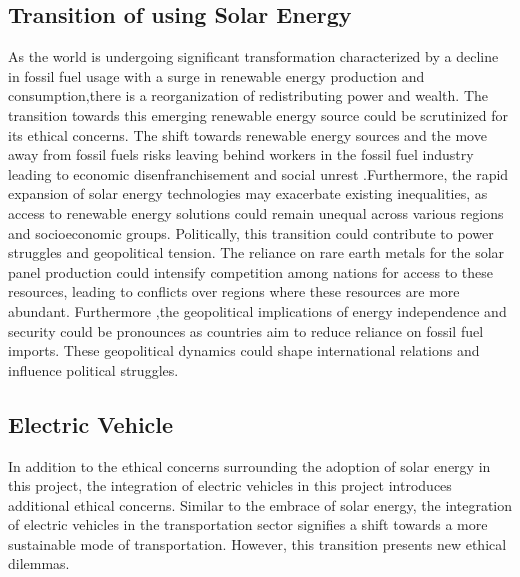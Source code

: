\documentclass[10pt,twocolumn]{article}
\begin{document}
\subsection{Transition of using Solar Energy}
As the world is undergoing significant transformation characterized by a decline in fossil fuel usage with a surge in renewable energy production and consumption,there is a reorganization of redistributing power and wealth. The transition towards this emerging renewable energy source could be scrutinized for its ethical concerns. The shift towards renewable energy sources and the move away from fossil fuels risks leaving behind workers in the fossil fuel industry leading to economic disenfranchisement and social unrest .Furthermore, the rapid expansion of solar energy technologies may exacerbate existing inequalities, as access to renewable energy solutions could remain unequal across various regions and socioeconomic groups. Politically, this transition could contribute to power struggles and geopolitical tension. The reliance on rare earth metals for the solar panel production could intensify competition among nations for access to these resources, leading to conflicts over regions where these resources are more abundant. Furthermore ,the geopolitical implications of energy independence and security could be pronounces as countries aim to reduce reliance on fossil fuel imports. These geopolitical dynamics could shape international relations and influence political struggles. 
\subsection{Electric Vehicle}
In addition to the ethical concerns surrounding the adoption of solar energy in this project, the integration of electric vehicles in this project introduces additional ethical concerns. Similar to the embrace of solar energy, the integration of electric vehicles in the transportation sector signifies a shift towards a more sustainable mode of transportation. However, this transition presents new ethical dilemmas.   
\end{document}
